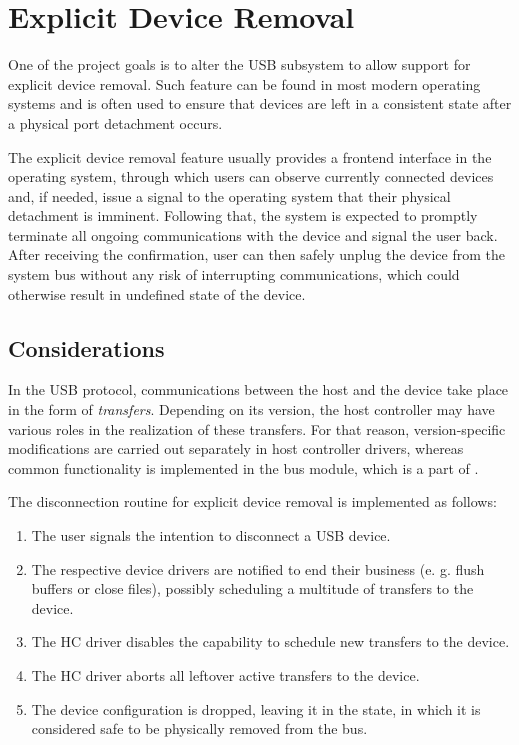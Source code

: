 \section{Explicit Device Removal}

One of the project goals is to alter the USB subsystem to allow support for
explicit device removal. Such feature can be found in most modern operating
systems and is often used to ensure that devices are left in a consistent state
after a physical port detachment occurs.

The explicit device removal feature usually provides a frontend interface in
the operating system, through which users can observe currently connected
devices and, if needed, issue a signal to the operating system that their
physical detachment is imminent. Following that, the system is expected to
promptly terminate all ongoing communications with the device and signal the
user back. After receiving the confirmation, user can then safely unplug the
device from the system bus without any risk of interrupting communications,
which could otherwise result in undefined state of the device.


\subsection{Considerations}

In the USB protocol, communications between the host and the device take place
in the form of \textit{transfers}. Depending on its version, the host controller
may have various roles in the realization of these transfers. For that reason,
version-specific modifications are carried out separately in host controller
drivers, whereas common functionality is implemented in the bus module, which is
a part of .

The disconnection routine for explicit device removal is implemented as follows:
%
\begin{enumerate}
	\item The user signals the intention to disconnect a USB device.
	\item The respective device drivers are notified to end their business (e.
		g. flush buffers or close files), possibly scheduling a multitude of
		transfers to the device.
	\item The HC driver disables the capability to schedule new transfers to the
		device.
	\item The HC driver aborts all leftover active transfers to the device.
	\item The device configuration is dropped, leaving it in the
		 state, in which it is considered safe to be
		physically removed from the bus.
\end{enumerate}


